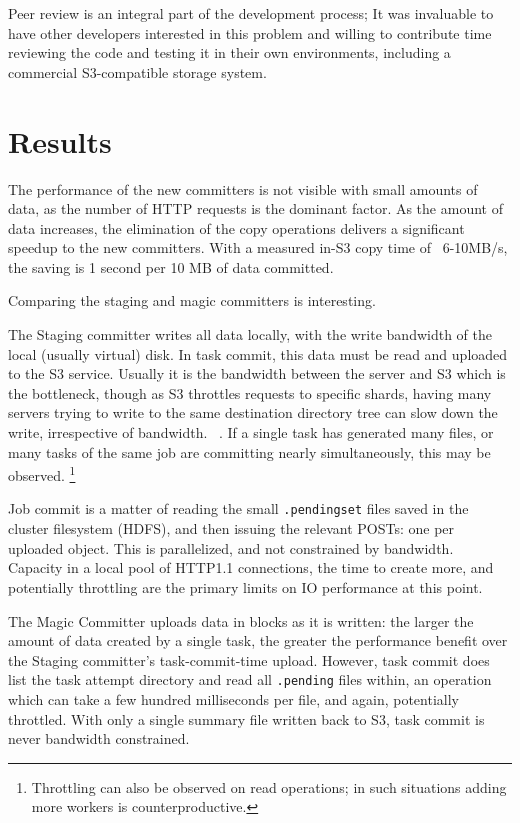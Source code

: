 \documentclass[conference]{IEEEtran}
\begin{document}
Peer review is an integral part of the development process;
It was invaluable to have other developers interested in this problem
and willing to contribute time reviewing the code and testing it
in their own environments, including a commercial S3-compatible
storage system.



\section{Results}
\label{sec:results}


The performance of the new committers is not visible with small amounts
of data, as the number of HTTP requests is the dominant factor.
As the amount of data increases, the elimination of the copy operations
delivers a significant speedup to the new committers.
With a measured in-S3 copy time of ~6-10MB/s, the saving is 1 second per 10 MB
of data committed.

Comparing the staging and magic committers is interesting.

The Staging committer writes all data locally, with the write bandwidth
of the local (usually virtual) disk.
In task commit, this data must be read and uploaded to the S3 service.
Usually it is the bandwidth between the server and S3 which is the bottleneck,
though as S3 throttles requests to specific shards, having many servers trying
to write to the same destination directory tree can slow down the write, irrespective
of bandwidth.
\ \cite{AWS-S3-throttling}.
If a single task has generated many files, or many tasks of the same job are
committing nearly simultaneously, this may be observed.
\footnote{Throttling can also be observed on read operations;
in such situations adding more workers is counterproductive.}

Job commit is a matter of reading the small \texttt{.pendingset} files saved in the
cluster filesystem (HDFS), and then issuing the relevant POSTs: one per uploaded
object.
This is parallelized, and not constrained by bandwidth.
Capacity in a local pool of HTTP1.1 connections, the time to create more,
and potentially throttling are the primary limits on IO performance at this point.

The Magic Committer uploads data in blocks as it is written: the larger
the amount of data created by a single task, the greater the performance
benefit over the Staging committer's task-commit-time upload.
However, task commit does list the task attempt directory and read all \texttt{.pending}
files within, an operation which can take a few hundred milliseconds per file,
and again, potentially throttled.
With only a single summary file written back to S3, task commit is never
bandwidth constrained.
\end{document}
